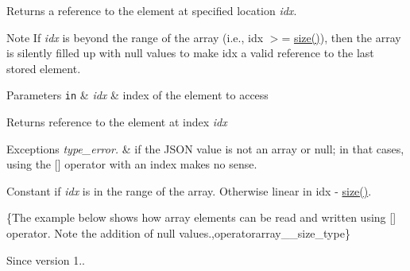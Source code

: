 Returns a reference to the element at specified location {\itshape idx}.

\begin{DoxyNote}{Note}
If {\itshape idx} is beyond the range of the array (i.\+e., {\ttfamily idx $>$= \mbox{\hyperlink{classnlohmann_1_1basic__json_a25e27ad0c6d53c01871c5485e1f75b96}{size()}}}), then the array is silently filled up with {\ttfamily null} values to make {\ttfamily idx} a valid reference to the last stored element.
\end{DoxyNote}

\begin{DoxyParams}[1]{Parameters}
\mbox{\tt in}  & {\em idx} & index of the element to access\\
\hline
\end{DoxyParams}
\begin{DoxyReturn}{Returns}
reference to the element at index {\itshape idx} 
\end{DoxyReturn}

\begin{DoxyExceptions}{Exceptions}
{\em type\+\_\+error.} & if the J\+S\+ON value is not an array or null; in that cases, using the \mbox{[}\mbox{]} operator with an index makes no sense.\\
\hline
\end{DoxyExceptions}
Constant if {\itshape idx} is in the range of the array. Otherwise linear in {\ttfamily idx -\/ \mbox{\hyperlink{classnlohmann_1_1basic__json_a25e27ad0c6d53c01871c5485e1f75b96}{size()}}}.

\{The example below shows how array elements can be read and written using {\ttfamily \mbox{[}\mbox{]}} operator. Note the addition of {\ttfamily null} values.,operatorarray\+\_\+\+\_\+size\+\_\+type\}

\begin{DoxySince}{Since}
version 1.. 
\end{DoxySince}
\mbox{\label{classnlohmann_1_1basic__json_a9cb592cd85c14f3e845e30d51cf17efb}} 
